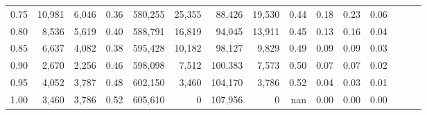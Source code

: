 \begin{tabular}{rrrrrrrrrrrrrrr}
0.75 &  10,981 &   6,046 &  0.36 &  580,255 &   25,355 &   88,426 &   19,530 &  0.44 &  0.18 &  0.23 &      0.06 \\
0.80 &   8,536 &   5,619 &  0.40 &  588,791 &   16,819 &   94,045 &   13,911 &  0.45 &  0.13 &  0.16 &      0.04 \\
0.85 &   6,637 &   4,082 &  0.38 &  595,428 &   10,182 &   98,127 &    9,829 &  0.49 &  0.09 &  0.09 &      0.03 \\
0.90 &   2,670 &   2,256 &  0.46 &  598,098 &    7,512 &  100,383 &    7,573 &  0.50 &  0.07 &  0.07 &      0.02 \\
0.95 &   4,052 &   3,787 &  0.48 &  602,150 &    3,460 &  104,170 &    3,786 &  0.52 &  0.04 &  0.03 &      0.01 \\
1.00 &   3,460 &   3,786 &  0.52 &  605,610 &        0 &  107,956 &        0 &   nan &  0.00 &  0.00 &      0.00 \\
\bottomrule
\end{tabular}
